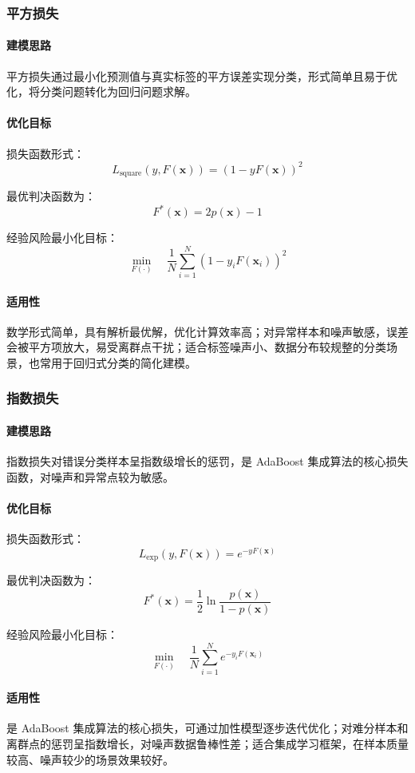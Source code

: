 \documentclass[12pt,a4paper]{article}
\newcommand{\x}{\boldsymbol{x}}
\begin{document}
\subsubsection{平方损失}
\paragraph{建模思路}
平方损失通过最小化预测值与真实标签的平方误差实现分类，形式简单且易于优化，将分类问题转化为回归问题求解。

\paragraph{优化目标}
损失函数形式：
$$
L_{\text{square}}(y, F(\x)) = \left(1 - yF(\x)\right)^2
$$

最优判决函数为：
$$
F^*(\x) = 2p(\x) - 1
$$

经验风险最小化目标：
$$
\min_{F(\cdot)} \quad \frac{1}{N} \sum_{i=1}^N \left(1 - y_i F(\x_i)\right)^2
$$

\paragraph{适用性}
数学形式简单，具有解析最优解，优化计算效率高；对异常样本和噪声敏感，误差会被平方项放大，易受离群点干扰；适合标签噪声小、数据分布较规整的分类场景，也常用于回归式分类的简化建模。

\subsubsection{指数损失}
\paragraph{建模思路}
指数损失对错误分类样本呈指数级增长的惩罚，是 AdaBoost 集成算法的核心损失函数，对噪声和异常点较为敏感。

\paragraph{优化目标}
损失函数形式：
$$
L_{\text{exp}}(y, F(\x)) = e^{-yF(\x)}
$$

最优判决函数为：
$$
F^*(\x) = \frac{1}{2} \ln \frac{p(\x)}{1-p(\x)}
$$

经验风险最小化目标：
$$
\min_{F(\cdot)} \quad \frac{1}{N} \sum_{i=1}^N e^{-y_i F(\x_i)}
$$

\paragraph{适用性}
是 AdaBoost 集成算法的核心损失，可通过加性模型逐步迭代优化；对难分样本和离群点的惩罚呈指数增长，对噪声数据鲁棒性差；适合集成学习框架，在样本质量较高、噪声较少的场景效果较好。
\end{document}

